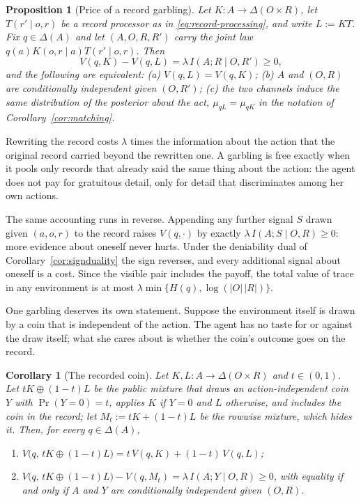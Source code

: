\documentclass[11pt,a4paper]{article}
\newtheorem{proposition}[theorem]{Proposition}
\newtheorem{corollary}[theorem]{Corollary}
\theoremstyle{definition}
\newcommand{\D}{\Delta}
\newcommand{\I}{I}
\newcommand{\Sh}{H}
\newcommand{\1}{\mathbf 1}
\begin{document}
\begin{proposition}[Price of a record garbling]\label{prop:garbling-price}
Let $K:A\to\D(O\times R)$, let $T(r'\mid o,r)$ be a record processor as in \eqref{eq:record-processing}, and write
$L:=KT$.  Fix $q\in\D(A)$ and let $(A,O,R,R')$ carry the joint law $q(a)K(o,r\mid a)T(r'\mid o,r)$.  Then
\[
 V(q,K)-V(q,L)=\lambda\,\I\!\left(A;R\mid O,R'\right)\ge0,
\]
and the following are equivalent:
\textup{(a)} $V(q,L)=V(q,K)$;
\textup{(b)} $A$ and $(O,R)$ are conditionally independent given $(O,R')$;
\textup{(c)} the two channels induce the same distribution of the posterior about the act,
$\mu_{qL}=\mu_{qK}$ in the notation of Corollary~\ref{cor:matching}.
\end{proposition}

Rewriting the record costs $\lambda$ times the information about the action that the original record carried
beyond the rewritten one.  A garbling is free exactly when it pools only records that already said the same
thing about the action: the agent does not pay for gratuitous detail, only for detail that discriminates among
her own actions.

The same accounting runs in reverse.  Appending any further signal $S$ drawn given $(a,o,r)$ to the record
raises $V(q,\cdot)$ by exactly $\lambda\,\I(A;S\mid O,R)\ge0$: more evidence about oneself never hurts.  Under
the deniability dual of Corollary~\ref{cor:signduality} the sign reverses, and every additional signal about
oneself is a cost.  Since the visible pair includes the payoff, the total value of trace in any environment is
at most $\lambda\min\{\Sh(q),\log(|O|\,|R|)\}$.

One garbling deserves its own statement.  Suppose the environment itself is drawn by a coin that is independent
of the action.  The agent has no taste for or against the draw itself; what she cares about is whether the
coin's outcome goes on the record.

\begin{corollary}[The recorded coin]\label{cor:recorded-coin}
Let $K,L:A\to\D(O\times R)$ and $t\in(0,1)$.  Let $tK\oplus(1-t)L$ be the public mixture that draws an
action-independent coin $Y$ with $\Pr(Y=0)=t$, applies $K$ if $Y=0$ and $L$ otherwise, and includes the coin in
the record; let $M_t:=tK+(1-t)L$ be the rowwise mixture, which hides it.  Then, for every $q\in\D(A)$,
\begin{enumerate}[label=\textup{(\roman*)},leftmargin=*]
\item $V\bigl(q,\,tK\oplus(1-t)L\bigr)=t\,V(q,K)+(1-t)\,V(q,L)$;
\item $V\bigl(q,\,tK\oplus(1-t)L\bigr)-V(q,M_t)=\lambda\,\I(A;Y\mid O,R)\ge0$, with equality if and only if $A$
and $Y$ are conditionally independent given $(O,R)$.
\end{enumerate}
\end{corollary}
\end{document}
